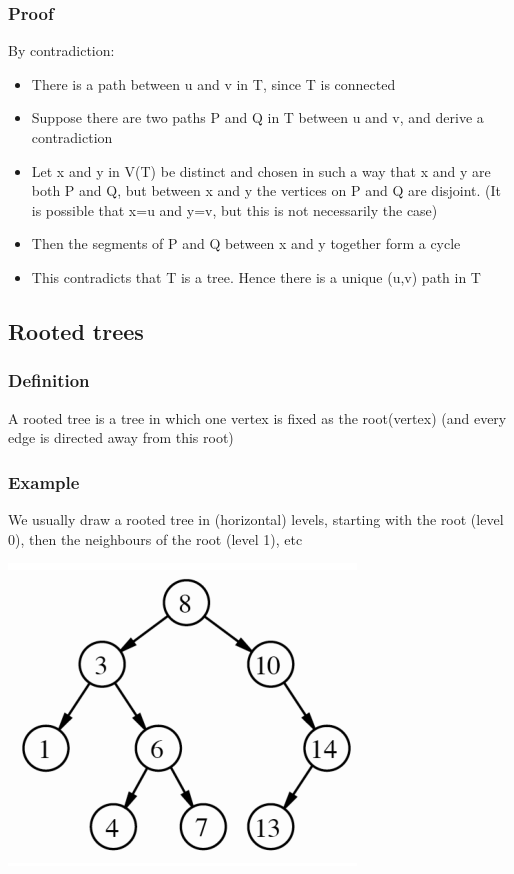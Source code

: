 \documentclass{article}[18pt]
\begin{document}
\subsubsection{Proof}
By contradiction:
\begin{itemize}
	\item There is a path between u and v in T, since T is connected
	\item Suppose there are two paths P and Q in T between u and v, and derive a contradiction
	\item Let x and y in V(T) be distinct and chosen in such a way that x and y are both P and Q, but between x and y the vertices on P and Q are disjoint. (It is possible that x=u and y=v, but this is not necessarily the case)
	\item Then the segments of P and Q between x and y together form a cycle
	\item This contradicts that T is a tree. Hence there is a unique (u,v) path in T
\end{itemize}
\subsection{Rooted trees}
\subsubsection{Definition}
A rooted tree is a tree in which one vertex is fixed as the root(vertex) (and every edge is directed away from this root)
\subsubsection{Example}
We usually draw a rooted tree in (horizontal) levels, starting with the root (level 0), then the neighbours of the root (level 1), etc
\begin{center}
	\includegraphics[scale=0.7]{root}
\end{center}
\end{document}
